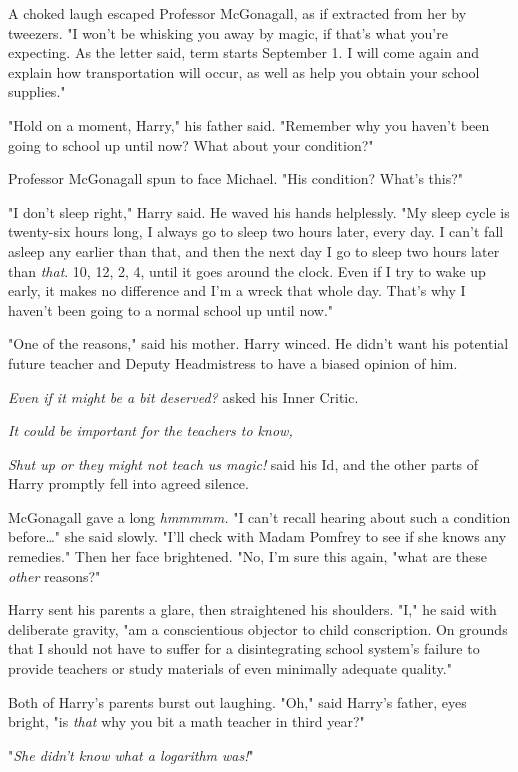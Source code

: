 {A choked laugh escaped Professor McGonagall, as if extracted from her by
tweezers. "I won't be whisking you away by
magic, if that's what you're expecting. As the letter said,
term starts September 1. I will come again and explain
how transportation will occur, as well as help you obtain
your school supplies."

"Hold on a moment, Harry," his father said. "Remember why you haven't been
going to school up until now? What about your condition?"

Professor McGonagall spun to face Michael. "His condition? What's this?"

"I don't sleep right," Harry said. He waved his hands helplessly. "My sleep
cycle is twenty-six hours long, I always go to sleep two hours later, every
day. I can't fall asleep any earlier than that, and then the next day I go to
sleep two hours later than \emph{that}. 10\PM, 12\AM, 2\AM, 4\AM, until it goes
around the clock. Even if I try to wake up early, it makes no difference and
I'm a wreck that whole day. That's why I haven't been going to a normal school
up until now."

"One of the reasons," said his mother. Harry winced. He
didn't want his potential future teacher and Deputy
Headmistress to have a biased opinion of him.

\emph{Even if it might be a bit deserved?} asked his Inner Critic.

\emph{It could be important for the teachers to know,}

\emph{Shut up or they might not teach us magic!} said his Id,
and the other parts of Harry promptly fell into agreed silence.

McGonagall gave a long \emph{hmmmmm.} "I can't recall hearing about such a
condition before{\ldots}" she said slowly. "I'll check with Madam Pomfrey to
see if she knows any remedies." Then her face brightened. "No, I'm sure this
again, "what are these \emph{other} reasons?"

Harry sent his parents a glare, then straightened his
shoulders. "I," he said with deliberate gravity, "am a
conscientious objector to child conscription. On grounds that
I should not have to suffer for a disintegrating school
system's failure to provide teachers or study materials of
even minimally adequate quality."

Both of Harry's parents burst out laughing.
"Oh," said Harry's father, eyes bright, "is \emph{that} why you
bit a math teacher in third year?"

"\emph{She didn't know what a logarithm was!}"

}
